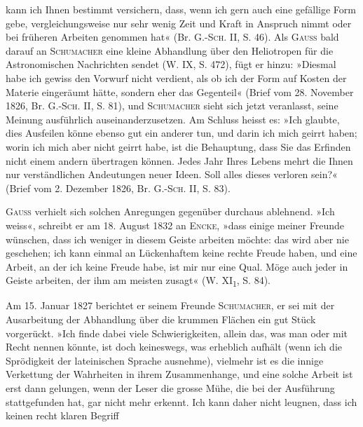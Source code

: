 kann ich Ihnen bestimmt versichern, dass, wenn ich gern auch eine gefällige
Form gebe,  vergleichungsweise nur sehr wenig Zeit und Kraft in Anspruch
nimmt oder bei früheren Arbeiten genommen hat« (Br. G.-\textsc{Sch.} II, S. 46).
\clearpage{}
\noindent\hspace*{\parindent}Als \textsc{Gauss} bald darauf an \textsc{Schumacher} eine kleine Abhandlung über den
Heliotropen für die Astronomischen Nachrichten sendet (W. IX, S. 472), fügt
er hinzu: »Diesmal habe ich gewiss den Vorwurf nicht verdient, als ob ich der
Form auf Kosten der Materie  eingeräumt hätte, sondern eher das Gegenteil«
(Brief vom 28. November 1826, Br. G.-\textsc{Sch.} II, S. 81), und \textsc{Schumacher}
sieht sich jetzt veranlasst, seine Meinung ausführlich auseinanderzusetzen. Am
Schluss heisst es: »Ich glaubte, dies Ausfeilen könne ebenso gut ein anderer
tun, und darin  ich mich geirrt haben; worin ich mich aber nicht geirrt
habe, ist die Behauptung, dass Sie das Erfinden nicht einem andern übertragen
können. Jedes Jahr Ihres Lebens mehrt die Ihnen nur verständlichen Andeutungen
neuer Ideen. Soll alles dieses verloren sein?« (Brief vom 2. Dezember
1826, Br. G.-\textsc{Sch.} II, S. 83).
\par
\textsc{Gauss} verhielt sich solchen Anregungen gegenüber durchaus ablehnend.
»Ich weiss«, schreibt er am 18. August 1832 an \textsc{Encke}, »dass einige meiner
Freunde wünschen, dass ich weniger in diesem Geiste arbeiten möchte: das
wird aber nie geschehen; ich kann einmal an Lückenhaftem keine rechte
Freude haben, und eine Arbeit, an der ich keine Freude habe, ist mir nur
eine Qual. Möge auch jeder in  Geiste arbeiten, der ihm am meisten
zusagt« (W. XI\textsubscript{1}, S. 84).
\par
Am 15. Januar 1827 berichtet er seinem Freunde \textsc{Schumacher}, er sei mit
der Ausarbeitung der Abhandlung über die krummen Flächen ein gut Stück
vorgerückt. »Ich finde dabei viele Schwierigkeiten, allein das, was man 
oder  mit Recht nennen könnte, ist doch keineswegs, was erheblich
aufhält (wenn ich die Sprödigkeit der lateinischen Sprache ausnehme),
vielmehr ist es die innige Verkettung der Wahrheiten in ihrem Zusammenhange,
und eine solche Arbeit ist erst dann gelungen, wenn der Leser die
grosse Mühe, die bei der Ausführung stattgefunden hat, gar nicht mehr erkennt.
Ich kann daher nicht leugnen, dass ich keinen recht klaren Begriff
